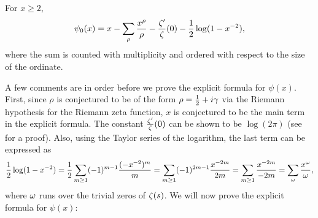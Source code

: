     \begin{theorem}
      For $x \ge 2$,
      \[
        \psi_{0}(x) = x-\sum_{\rho}\frac{x^{\rho}}{\rho}-\frac{\zeta'}{\zeta}(0)-\frac{1}{2}\log(1-x^{-2}),
      \]
      where the sum is counted with multiplicity and ordered with respect to the size of the ordinate.
    \end{theorem}

    A few comments are in order before we prove the explicit formula for $\psi(x)$. First, since $\rho$ is conjectured to be of the form $\rho = \frac{1}{2}+i\gamma$ via the Riemann hypothesis for the Riemann zeta function, $x$ is conjectured to be the main term in the explicit formula. The constant $\frac{\zeta'}{\zeta}(0)$ can be shown to be $\log(2\pi)$ (see \cite{davenport1980multiplicative} for a proof). Also, using the Taylor series of the logarithm, the last term can be expressed as
    \[
      \frac{1}{2}\log(1-x^{-2}) = \frac{1}{2}\sum_{m \ge 1}(-1)^{m-1}\frac{(-x^{-2})^{m}}{m} = \sum_{m \ge 1}(-1)^{2m-1}\frac{x^{-2m}}{2m} = \sum_{m \ge 1}\frac{x^{-2m}}{-2m} = \sum_{\omega}\frac{x^{\omega}}{\omega},
    \]
    where $\omega$ runs over the trivial zeros of $\zeta(s)$. We will now prove the explicit formula for $\psi(x)$:

